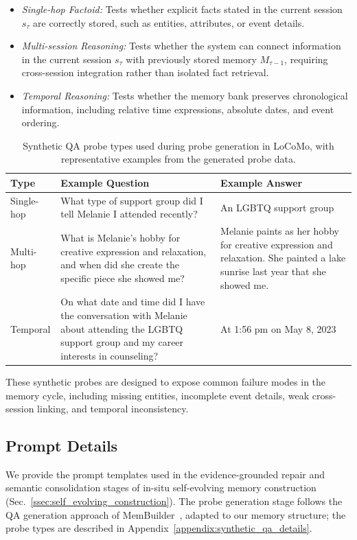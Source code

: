 \begin{itemize}[leftmargin=*]
\item \emph{Single-hop Factoid:} Tests whether explicit facts stated in the current session $s_\tau$ are correctly stored, such as entities, attributes, or event details.
\item \emph{Multi-session Reasoning:} Tests whether the system can connect information in the current session $s_\tau$ with previously stored memory $M_{\tau-1}$, requiring cross-session integration rather than isolated fact retrieval.
\item \emph{Temporal Reasoning:} Tests whether the memory bank preserves chronological information, including relative time expressions, absolute dates, and event ordering.
\end{itemize}
\begin{table}[h]
\centering
\small
\caption{Synthetic QA probe types used during probe generation in LoCoMo, with representative examples from the generated probe data.}
\label{tab:synthetic_qa_types}
\begin{tabular}{p{1.8cm}p{5.6cm}p{5.2cm}}
\toprule
\textbf{Type} & \textbf{Example Question} & \textbf{Example Answer} \\
\midrule
Single-hop & What type of support group did I tell Melanie I attended recently? & An LGBTQ support group \\
\midrule
Multi-hop & What is Melanie's hobby for creative expression and relaxation, and when did she create the specific piece she showed me? & Melanie paints as her hobby for creative expression and relaxation. She painted a lake sunrise last year that she showed me. \\
\midrule
Temporal & On what date and time did I have the conversation with Melanie about attending the LGBTQ support group and my career interests in counseling? & At 1:56 pm on May 8, 2023 \\
\bottomrule
\end{tabular}
\end{table}

These synthetic probes are designed to expose common failure modes in the memory cycle, including missing entities, incomplete event details, weak cross-session linking, and temporal inconsistency.



\subsection{Prompt Details}
\label{appendix:prompt_details}
We provide the prompt templates used in the evidence-grounded repair and semantic consolidation stages of in-situ self-evolving memory construction (Sec.~\ref{ssec:self_evolving_construction}).
The probe generation stage follows the QA generation approach of MemBuilder~\cite{shen2026membuilder}, adapted to our memory structure; the probe types are described in Appendix~\ref{appendix:synthetic_qa_details}.

